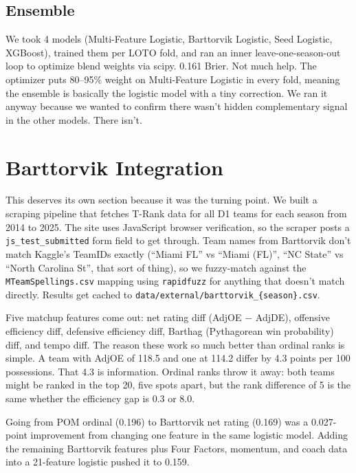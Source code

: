 \documentclass[11pt,a4paper]{article}
\begin{document}
\subsection{Ensemble}

We took 4 models (Multi-Feature Logistic, Barttorvik Logistic, Seed Logistic, XGBoost), trained them per LOTO fold, and ran an inner leave-one-season-out loop to optimize blend weights via scipy. 0.161 Brier. Not much help. The optimizer puts 80--95\% weight on Multi-Feature Logistic in every fold, meaning the ensemble is basically the logistic model with a tiny correction. We ran it anyway because we wanted to confirm there wasn't hidden complementary signal in the other models. There isn't.


\section{Barttorvik Integration}

This deserves its own section because it was the turning point. We built a scraping pipeline that fetches T-Rank data for all D1 teams for each season from 2014 to 2025. The site uses JavaScript browser verification, so the scraper posts a \texttt{js\_test\_submitted} form field to get through. Team names from Barttorvik don't match Kaggle's TeamIDs exactly (``Miami FL'' vs ``Miami (FL)'', ``NC State'' vs ``North Carolina St'', that sort of thing), so we fuzzy-match against the \texttt{MTeamSpellings.csv} mapping using \texttt{rapidfuzz} for anything that doesn't match directly. Results get cached to \texttt{data/external/barttorvik\_\{season\}.csv}.

Five matchup features come out: net rating diff (AdjOE $-$ AdjDE), offensive efficiency diff, defensive efficiency diff, Barthag (Pythagorean win probability) diff, and tempo diff. The reason these work so much better than ordinal ranks is simple. A team with AdjOE of 118.5 and one at 114.2 differ by 4.3 points per 100 possessions. That 4.3 is information. Ordinal ranks throw it away: both teams might be ranked in the top 20, five spots apart, but the rank difference of 5 is the same whether the efficiency gap is 0.3 or 8.0.

Going from POM ordinal (0.196) to Barttorvik net rating (0.169) was a 0.027-point improvement from changing one feature in the same logistic model. Adding the remaining Barttorvik features plus Four Factors, momentum, and coach data into a 21-feature logistic pushed it to 0.159.
\end{document}
